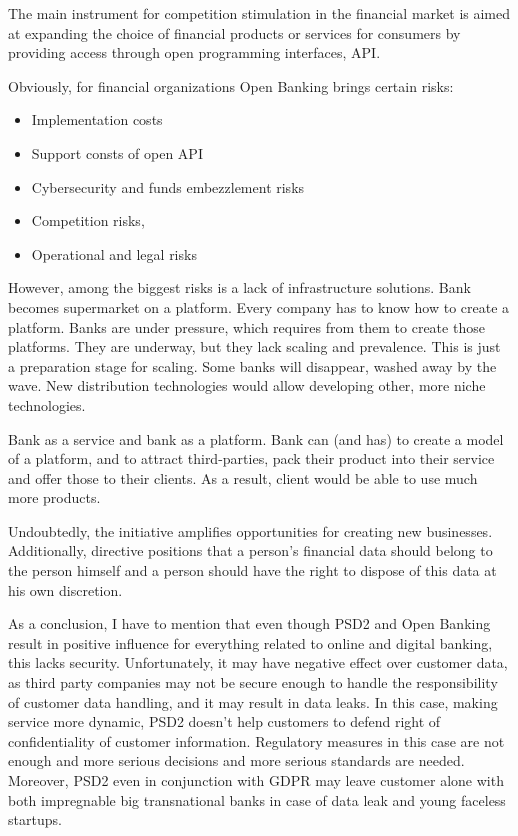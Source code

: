 The main instrument for competition stimulation in the financial market is aimed at expanding the choice of financial products or services for consumers by providing access through open programming interfaces, API.

Obviously, for financial organizations Open Banking brings certain risks: 
\begin{itemize}
    \item Implementation costs
    \item Support consts of open API 
    \item Cybersecurity and funds embezzlement risks
    \item Competition risks, 
    \item Operational and legal risks
\end{itemize}

However, among the biggest risks is a lack of infrastructure solutions.
Bank becomes supermarket on a platform.
Every company has to know how to create a platform.
Banks are under pressure, which requires from them to create those platforms.
They are underway, but they lack scaling and prevalence.
This is just a preparation stage for scaling.
Some banks will disappear, washed away by the wave.
New distribution technologies would allow developing other, more niche technologies.

Bank as a service and bank as a platform.
Bank can (and has) to create a model of a platform, and to attract third-parties, pack their product into their service and offer those to their clients.
As a result, client would be able to use much more products.

Undoubtedly, the initiative amplifies opportunities for creating new businesses. 
Additionally, directive positions that a person's financial data should belong to the person himself and a person should have the right to dispose of this data at his own discretion.

As a conclusion, I have to mention that even though PSD2 and Open Banking result in positive influence for everything related to online and digital banking, this lacks security. Unfortunately, it may have negative effect over customer data, as third party companies may not be secure enough to handle the responsibility of customer data handling, and it may result in data leaks. In this case, making service more dynamic, PSD2 doesn't help customers to defend right of confidentiality of customer information. 
Regulatory measures in this case are not enough and more serious decisions and more serious standards are needed.
Moreover, PSD2 even in conjunction with GDPR may leave customer alone with both impregnable big transnational banks in case of data leak and young faceless startups.

